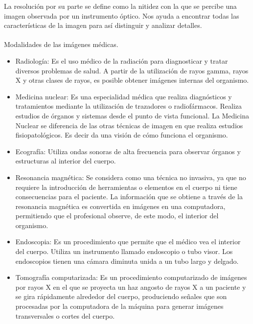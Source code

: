 \documentclass[12pt]{report}
\begin{document}
La resolución por su parte se define como la nitidez con la que se percibe una imagen observada por un instrumento óptico. Nos ayuda a encontrar todas las características de la imagen para así distinguir y analizar detalles.\cite{essen}\\ \\
Modalidades de las imágenes médicas.\cite{modim}\\
\begin{itemize}
\item Radiología: Es el uso médico de la radiación para diagnosticar y tratar diversos problemas de salud. A partir de la utilización de rayos gamma, rayos X y otras clases de rayos, es posible obtener imágenes internas del organismo.
\item Medicina nuclear: Es una especialidad médica que realiza diagnósticos y tratamientos mediante la utilización de trazadores o radiofármacos. Realiza estudios de órganos y sistemas desde el punto de vista funcional.  La Medicina Nuclear se diferencia de las otras técnicas de imagen en que realiza estudios fisiopatológicos. Es decir da una visión de cómo funciona el organismo.
\item Ecografía: Utiliza ondas sonoras de alta frecuencia para observar órganos y estructuras al interior del cuerpo.
\item Resonancia magnética: Se considera como una técnica no invasiva, ya que no requiere la introducción de herramientas o elementos en el cuerpo ni tiene consecuencias para el paciente. La información que se obtiene a través de la resonancia magnética es convertida en imágenes en una computadora, permitiendo que el profesional observe, de este modo, el interior del organismo.
\item Endoscopia: Es un procedimiento que permite que el médico vea el interior del cuerpo. Utiliza un instrumento llamado endoscopio o tubo visor. Los endoscopios tienen una cámara diminuta unida a un tubo largo y delgado.
\item Tomografía computarizada: Es un procedimiento computarizado de imágenes por rayos X en el que se proyecta un haz angosto de rayos X a un paciente y se gira rápidamente alrededor del cuerpo, produciendo señales que son procesadas por la computadora de la máquina para generar imágenes transversales o cortes del cuerpo.
\end{itemize}
\end{document}
